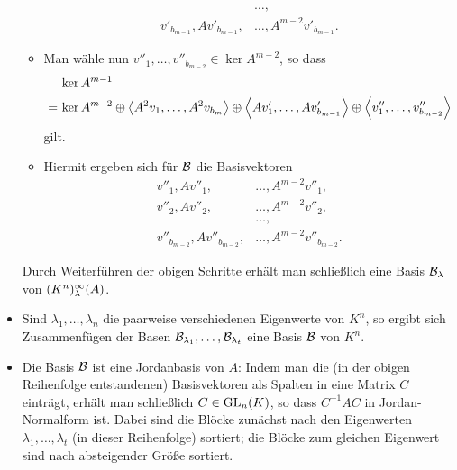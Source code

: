 \begin{itemize}[resume]
\begin{itemize}
\begin{align*}
                                        &\dotsc,                        \\
          v'_{b_{m-1}}, A v'_{b_{m-1}}, &\dotsc, A^{m-2} v'_{b_{m-1}}.
        \end{align*}
      \item
        Man wähle nun $v''_1, \dotsc, v''_{b_{m-2}} \in \ker A^{m-2}$, so dass
        \begin{align*}
           &\,      \ker A^{m-1}  \\
          =&\,      \ker A^{m-2}
            \oplus  \left\langle  A^2 v_1, \dotsc, A^2 v_{b_m}  \right\rangle
            \oplus  \left\langle  A v'_1, \dotsc, A v'_{b_{m-1}}  \right\rangle
            \oplus  \left\langle  v''_1, \dotsc, v''_{b_{m-2}}  \right\rangle
        \end{align*}
        gilt.
      \item
        Hiermit ergeben sich für $\mathcal{B}$ die Basisvektoren
        \begin{align*}
          v''_1,         A v''_1,         &\dotsc, A^{m-2} v''_1,         \\
          v''_2,         A v''_2,         &\dotsc, A^{m-2} v''_2,         \\
                                          &\dotsc,                        \\
          v''_{b_{m-2}}, A v''_{b_{m-2}}, &\dotsc, A^{m-2} v''_{b_{m-2}}.
        \end{align*}
    \end{itemize}
    Durch Weiterführen der obigen Schritte erhält man schließlich eine Basis $\mathcal{B}_\lambda$ von $(K^n)_{\lambda}^{\infty}(A)$.
    
  \item
    Sind $\lambda_1, \dotsc, \lambda_n$ die paarweise verschiedenen Eigenwerte von $K^n$, so ergibt sich Zusammenfügen der Basen $\mathcal{B}_{\lambda_1}, \dotsc, \mathcal{B}_{\lambda_t}$ eine Basis $\mathcal{B}$ von $K^n$.
 
  \item
    Die Basis $\mathcal{B}$ ist eine Jordanbasis von $A$:
    Indem man die (in der obigen Reihenfolge entstandenen) Basisvektoren als Spalten in eine Matrix $C$ einträgt, erhält man schließlich $C \in \operatorname{GL}_{n}(K)$, so dass $C^{-1} A C$ in Jordan-Normalform ist.
    Dabei sind die Blöcke zunächst nach den Eigenwerten $\lambda_1, \dotsc, \lambda_t$ (in dieser Reihenfolge) sortiert;
    die Blöcke zum gleichen Eigenwert sind nach absteigender Größe sortiert.
\end{itemize}

